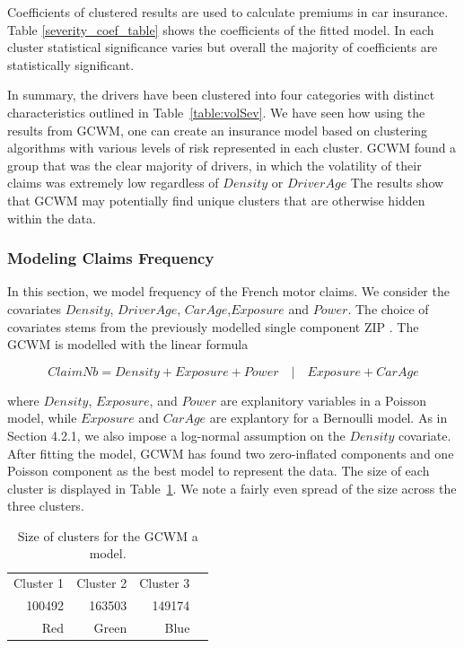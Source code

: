 \documentclass[11pt,letterpaper]{article}
\numberwithin{equation}{section}
\numberwithin{equation}{section}
\numberwithin{equation}{section}
\begin{document}
Coefficients of clustered results are used to calculate premiums in car insurance. Table \ref{severity_coef_table} shows the coefficients of the fitted model. In each cluster statistical significance varies but overall the majority of coefficients are statistically significant.

In summary, the drivers have been clustered into four categories with distinct characteristics outlined in Table~\ref{table:volSev}. We have seen how using the results from GCWM, one can create an insurance model based on clustering algorithms with various levels of risk represented in each cluster. GCWM found a group that was the clear majority of drivers, in which the volatility of their claims was extremely low regardless of $Density$ or $DriverAge$ The results show that GCWM may potentially find unique clusters that are otherwise hidden within the data.


 \subsubsection{Modeling Claims Frequency}

In this section, we model frequency of the French motor claims. We consider the covariates $Density$, $DriverAge$, $CarAge$,$Exposure$ and $Power$. The choice of covariates stems from the previously modelled single component ZIP \citep{Charpentier:2014}.
The GCWM is modelled with the linear formula

\begin{equation}
Claim Nb = Density + Exposure + Power \quad|\quad Exposure + Car Age
\end{equation}

where $Density$, $Exposure$, and $Power$ are explanitory variables in a Poisson model, while $Exposure$ and $Car Age$ are explantory for a Bernoulli model. As in Section 4.2.1, we also impose a log-normal assumption on the $Density$ covariate.
After fitting the model, GCWM has found two zero-inflated components and one Poisson component as the best model to represent the data. The size of each cluster is displayed in Table~\ref{table:sizeFreq}. We note a fairly even spread of the size across the three clusters.

 \begin{table}[!htb]
\centering
\caption{Size of clusters for the GCWM a model.}
\label{table:sizeFreq}
\begin{tabular}{rrrr}
\hline\hline
Cluster 1   & Cluster 2  & Cluster 3   \\
100492 & 163503 & 149174 \\
Red & Green & Blue  \\
\hline\hline
\end{tabular}
\end{table}
\end{document}
